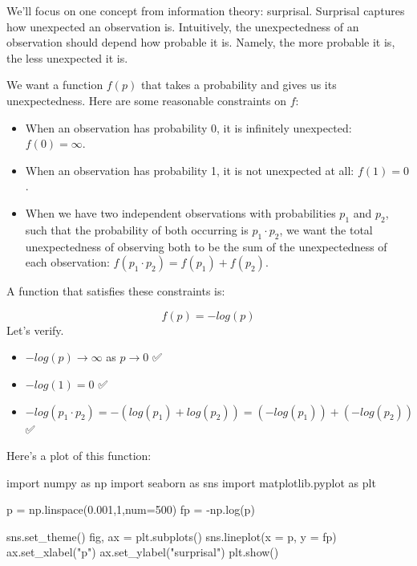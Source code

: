 \documentclass[
  letterpaper,
  DIV=11,
  numbers=noendperiod]{scrreprt}
\newenvironment{Shaded}{\begin{snugshade}}{\end{snugshade}}
\newcommand{\DecValTok}[1]{\textcolor[rgb]{0.68,0.00,0.00}{#1}}
\newcommand{\FloatTok}[1]{\textcolor[rgb]{0.68,0.00,0.00}{#1}}
\newcommand{\ImportTok}[1]{\textcolor[rgb]{0.00,0.46,0.62}{#1}}
\newcommand{\NormalTok}[1]{\textcolor[rgb]{0.00,0.23,0.31}{#1}}
\newcommand{\OperatorTok}[1]{\textcolor[rgb]{0.37,0.37,0.37}{#1}}
\newcommand{\StringTok}[1]{\textcolor[rgb]{0.13,0.47,0.30}{#1}}
\providecommand{\tightlist}{%
  \setlength{\itemsep}{0pt}\setlength{\parskip}{0pt}}
\begin{document}
We'll focus on one concept from information theory: surprisal. Surprisal
captures how unexpected an observation is. Intuitively, the
unexpectedness of an observation should depend how probable it is.
Namely, the more probable it is, the less unexpected it is.

We want a function \(f(p)\) that takes a probability and gives us its
unexpectedness. Here are some reasonable constraints on \(f\):

\begin{itemize}
\tightlist
\item
  When an observation has probability 0, it is infinitely unexpected:
  \(f(0) = \infty\).
\item
  When an observation has probability 1, it is not unexpected at all:
  \(f(1) = 0\).
\item
  When we have two independent observations with probabilities \(p_1\)
  and \(p_2\), such that the probability of both occurring is
  \(p_1 \cdot p_2\), we want the total unexpectedness of observing both
  to be the sum of the unexpectedness of each observation:
  \(f(p_1 \cdot p_2) = f(p_1) + f(p_2)\).
\end{itemize}

A function that satisfies these constraints is:

\[
f(p) = -log(p)
\] Let's verify.

\begin{itemize}
\tightlist
\item
  \(-log(p) \rightarrow \infty\) as \(p \rightarrow 0\) ✅
\item
  \(-log(1) = 0\) ✅
\item
  \(-log(p_1 \cdot p_2) = -(log(p_1) + log(p_2)) = (-log(p_1))+(-log(p_2))\)
  ✅
\end{itemize}

Here's a plot of this function:

\begin{Shaded}
\begin{Highlighting}[]
\ImportTok{import}\NormalTok{ numpy }\ImportTok{as}\NormalTok{ np}
\ImportTok{import}\NormalTok{ seaborn }\ImportTok{as}\NormalTok{ sns}
\ImportTok{import}\NormalTok{ matplotlib.pyplot }\ImportTok{as}\NormalTok{ plt}

\NormalTok{p }\OperatorTok{=}\NormalTok{ np.linspace(}\FloatTok{0.001}\NormalTok{,}\DecValTok{1}\NormalTok{,num}\OperatorTok{=}\DecValTok{500}\NormalTok{)}
\NormalTok{fp }\OperatorTok{=} \OperatorTok{{-}}\NormalTok{np.log(p)}

\NormalTok{sns.set\_theme()}
\NormalTok{fig, ax }\OperatorTok{=}\NormalTok{ plt.subplots()}
\NormalTok{sns.lineplot(x }\OperatorTok{=}\NormalTok{ p, y }\OperatorTok{=}\NormalTok{ fp)}
\NormalTok{ax.set\_xlabel(}\StringTok{"p"}\NormalTok{)}
\NormalTok{ax.set\_ylabel(}\StringTok{"surprisal"}\NormalTok{)}
\NormalTok{plt.show()}
\end{Highlighting}
\end{Shaded}
\end{document}

